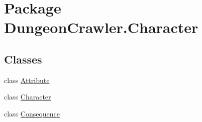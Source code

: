 \hypertarget{namespace_dungeon_crawler_1_1_character}{}\section{Package Dungeon\+Crawler.\+Character}
\label{namespace_dungeon_crawler_1_1_character}
\subsection*{Classes}
\begin{DoxyCompactItemize}
\item 
class \hyperlink{class_dungeon_crawler_1_1_character_1_1_attribute}{Attribute}
\item 
class \hyperlink{class_dungeon_crawler_1_1_character_1_1_character}{Character}
\item 
class \hyperlink{class_dungeon_crawler_1_1_character_1_1_consequence}{Consequence}
\end{DoxyCompactItemize}
